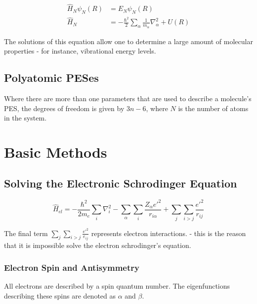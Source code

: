 \documentclass[
  letterpaper,
  DIV=11,
  numbers=noendperiod]{scrreprt}
\begin{document}
\begin{align}
  \hat{H}_N\psi_N(R) &= E_N\psi_N(R) \\ 
  \hat{H}_N &= -\frac{\hbar^2}{2}\sum_\alpha\frac{1}{m_\alpha}\nabla_\alpha^2 + U(R)
\end{align}

The solutions of this equation allow one to determine a large amount of
molecular properties - for instance, vibrational energy levels.

\hypertarget{polyatomic-peses}{%
\subsection{Polyatomic PESes}\label{polyatomic-peses}}

Where there are more than one parameters that are used to describe a
molecule's PES, the degrees of freedom is given by \(3n - 6\), where
\(N\) is the number of atoms in the system.

\hypertarget{basic-methods}{%
\section{Basic Methods}\label{basic-methods}}

\hypertarget{solving-the-electronic-schrodinger-equation}{%
\subsection{Solving the Electronic Schrodinger
Equation}\label{solving-the-electronic-schrodinger-equation}}

\begin{equation}
  \hat{H}_{el} = -\frac{\hbar^2}{2m_e}\sum_i\nabla_i^2 - \sum_\alpha\sum_i\frac{Z_\alpha e'^2}{r_{i\alpha}} + \sum_j\sum_{i > j}\frac{e'^2}{r_{ij}}
\end{equation}

The final term \(\displaystyle \sum_j\sum_{i > j}\frac{e'^2}{e_{ij}}\)
represents electron interactions. - this is the reason that it is
impossible solve the electron schrodinger's equation.

\hypertarget{electron-spin-and-antisymmetry}{%
\subsubsection{Electron Spin and
Antisymmetry}\label{electron-spin-and-antisymmetry}}

All electrons are described by a spin quantum number. The eigenfunctions
describing these spins are denoted as \(\alpha\) and \(\beta\).
\end{document}
